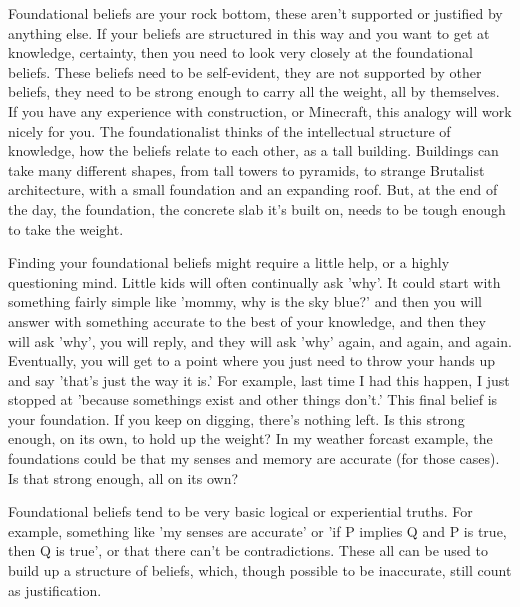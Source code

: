 Foundational beliefs are your rock bottom, these aren't supported or justified by anything else. If your beliefs are structured in this way and you want to get at knowledge, certainty, then you need to look very closely at the foundational beliefs. These beliefs need to be self-evident, they are not  supported by other beliefs, they need to be strong enough to carry all the weight, all by themselves.  If you have any experience with construction, or Minecraft, this analogy will work nicely for you. The foundationalist thinks of the intellectual structure of knowledge, how the beliefs relate to each other, as a tall building. Buildings can take many different shapes, from tall towers to pyramids, to strange Brutalist architecture, with a small foundation and an expanding roof. But, at the end of the day, the foundation, the concrete slab it's built on, needs to be tough enough to take the weight. 

Finding your foundational beliefs might require a little help, or a highly questioning mind. Little kids will often continually ask 'why'. It could start with something fairly simple like 'mommy, why is the sky blue?' and then you will answer with something accurate to the best of your knowledge, and then they will ask 'why', you will reply, and they will ask 'why' again, and again, and again. Eventually, you will get to a point where you just need to throw your hands up and say 'that's just the way it is.' For example, last time I had this happen, I just stopped at 'because somethings exist and other things don't.' This final belief is your foundation. If you keep on digging, there's nothing left. Is this strong enough, on its own, to hold up the weight? In my weather forcast example, the foundations could be that my senses and memory are accurate (for those cases). Is that strong enough, all on its own? 

Foundational beliefs tend to be very basic logical or experiential truths. For example, something like 'my senses are accurate' or 'if P implies Q and P is true, then Q is true', or that there can't be contradictions. These all can be used to build up a structure of beliefs, which, though possible to be inaccurate, still count as justification.

